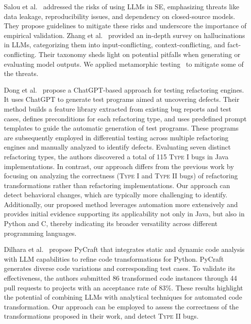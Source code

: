 Salou et al.~\cite{sallou2024breaking} addressed the risks of using LLMs in SE, emphasizing threats like data leakage, reproducibility issues, and dependency on closed-source models. They propose guidelines to mitigate these risks and underscore the importance of empirical validation. 
Zhang et al.~\cite{zhang2023siren} provided an in-depth survey on hallucinations in LLMs, categorizing them into input-conflicting, context-conflicting, and fact-conflicting. Their taxonomy sheds light on potential pitfalls when generating or evaluating model outputs. 
We applied metamorphic testing~\cite{metamorphic-testing-2} to mitigate some of the threats.

Dong et al.~\cite{dong-icse-2025} propose a ChatGPT-based approach for testing refactoring engines. It uses ChatGPT to generate test programs aimed at uncovering defects. Their method builds a feature library extracted from existing bug reports and test cases, defines preconditions for each refactoring type, and uses predefined prompt templates to guide the automatic generation of test programs. These programs are subsequently employed in differential testing across multiple refactoring engines and manually analyzed to identify defects. Evaluating seven distinct refactoring types, the authors discovered a total of 115 \textsc{Type I} bugs in Java implementations.
In contrast, our approach differs from the previous work by focusing on analyzing the correctness (\textsc{Type I} and \textsc{Type II} bugs) of refactoring transformations rather than refactoring implementations. Our approach can detect behavioral changes, which are typically more challenging to identify. Additionally, our proposed method leverages automation more extensively and provides initial evidence supporting its applicability not only in Java, but also in Python and C, thereby indicating its broader versatility across different programming languages.

Dilhara et al.~\cite{DBLP:journals/pacmse/DilharaBBD24} propose PyCraft that integrates static and dynamic code analysis with LLM capabilities to refine code transformations for Python. PyCraft generates diverse code variations and corresponding test cases. To validate its effectiveness, the authors submitted 86 transformed code instances through 44 pull requests to projects with an acceptance rate of 83\%. These results highlight the potential of combining LLMs with analytical techniques for automated code transformation. 
Our approach can be employed to assess the correctness of the transformations proposed in their work, and detect \textsc{Type II} bugs.

